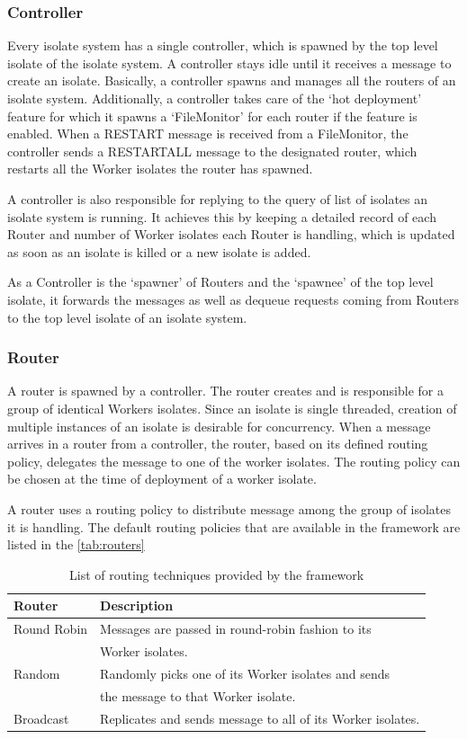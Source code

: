   \subsubsection{Controller}
  Every isolate system has a single controller, which is spawned by the top level isolate of the isolate system. A controller stays idle until it receives a message to create an isolate. Basically, a controller spawns and manages all the routers of an isolate system. Additionally, a controller takes care of the ‘hot deployment’ feature for which it spawns a ‘FileMonitor’ for each router if the feature is enabled. When a RESTART message is received from a FileMonitor, the controller sends a RESTART\textunderscore{}ALL message to the designated router, which restarts all the Worker isolates the router has spawned.

  A controller is also responsible for replying to the query of list of isolates an isolate system is running. It achieves this by keeping a detailed record of each Router and number of Worker isolates each Router is handling, which is updated as soon as an isolate is killed or a new isolate is added.

  As a Controller is the ‘spawner’ of Routers and the ‘spawnee’ of the top level isolate, it forwards the messages as well as dequeue requests coming from Routers to the top level isolate of an isolate system.

  \subsubsection{Router}
  A router is spawned by a controller. The router creates and is responsible for a group of identical Workers isolates. Since an isolate is single threaded, creation of multiple instances of an isolate is desirable for concurrency. When a message arrives in a router from a controller, the router, based on its defined routing policy, delegates the message to one of the worker isolates. The routing policy can be chosen at the time of deployment of a worker isolate.

  A router uses a routing policy to distribute message among the group of isolates it is handling. The default routing policies that are available in the framework are listed in the \autoref{tab:routers}
\begin{table}[htsb]
  \caption[Routing techniques provided by the framework]{List of routing techniques provided by the framework}\label{tab:routers}
  \centering
  \begin{tabular}{l l}
    \toprule
      Router & Description \\
    \midrule
      Round Robin &  Messages are passed in round-robin fashion to its \\ & Worker isolates.\\
      Random &  Randomly picks one of its Worker isolates and sends\\ & the message to that Worker isolate.\\
      Broadcast & Replicates and sends message to all of its Worker isolates.\\
    \bottomrule
  \end{tabular}
\end{table}

